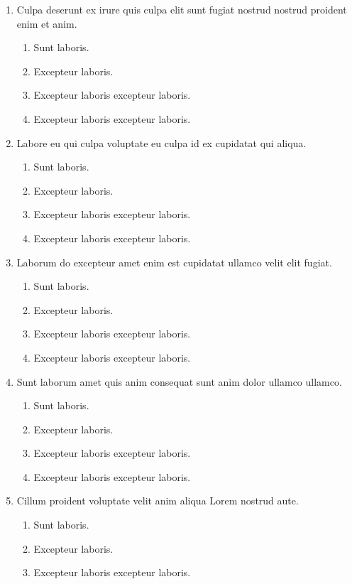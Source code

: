 \documentclass[a4paper,12pt]{article}
\begin{document}
\begin{enumerate}[label=\textbf{\arabic*.}]
  \item Culpa deserunt ex irure quis culpa elit sunt fugiat nostrud nostrud proident enim et anim.
  \begin{enumerate}
    \item Sunt laboris.
    \item Excepteur laboris.
    \item Excepteur laboris excepteur laboris.
    \item Excepteur laboris excepteur laboris.
  \end{enumerate}
  \item Labore eu qui culpa voluptate eu culpa id ex cupidatat qui aliqua.
  \begin{enumerate}
    \item Sunt laboris.
    \item Excepteur laboris.
    \item Excepteur laboris excepteur laboris.
    \item Excepteur laboris excepteur laboris.
  \end{enumerate}
  \item Laborum do excepteur amet enim est cupidatat ullamco velit elit fugiat.
  \begin{enumerate}
    \item Sunt laboris.
    \item Excepteur laboris.
    \item Excepteur laboris excepteur laboris.
    \item Excepteur laboris excepteur laboris.
  \end{enumerate}
  \item Sunt laborum amet quis anim consequat sunt anim dolor ullamco ullamco.
  \begin{enumerate}
    \item Sunt laboris.
    \item Excepteur laboris.
    \item Excepteur laboris excepteur laboris.
    \item Excepteur laboris excepteur laboris.
  \end{enumerate}
  \item Cillum proident voluptate velit anim aliqua Lorem nostrud aute.
  \begin{enumerate}
    \item Sunt laboris.
    \item Excepteur laboris.
    \item Excepteur laboris excepteur laboris.

\end{enumerate}
\end{enumerate}
\end{document}
